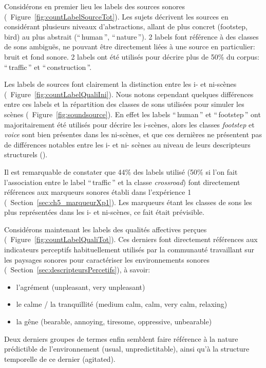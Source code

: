 Considérons en premier lieu les labels des sources sonores (\cf~Figure~\ref{fig:countLabelSourceTot}). Les sujets décrivent les sources en considérant plusieurs niveaux d'abstractions, allant de plus concret (footstep, bird) au plus abstrait (``\,human\,'', ``\,nature\,''). 2 labels font référence à des classes de sons ambiguës, ne pouvant être directement liées à une source en particulier: bruit et fond sonore. 2 labels ont été utilisés pour décrire plus de 50\% du corpus: ``\,traffic\,'' et ``\,construction\,''. 

Les labels de sources font clairement la distinction entre les i- et ni-scènes (\cf~Figure~\ref{fig:countLabelQualiIni}). Nous notons cependant quelques différences entre ces labels et la répartition des classes de sons utilisées pour simuler les scènes (\cf~Figure~\ref{fig:soundsource}).  En effet les labels ``\,human\,'' et ``\,footstep\,'' ont majoritairement été utilisés pour décrire les i-scènes, alors les classes \emph{footstep} et \emph{voice} sont bien présentes dans les ni-scènes, et que ces dernières ne présentent pas de différences notables entre les i- et ni- scènes au niveau de leurs descripteurs structurels (). 
 
Il est remarquable de constater que 44\% des labels utilisé (50\% si l'on fait l'association entre le label ``\,traffic\,'' et la classe \emph{crossroad}) font directement références aux marqueurs sonores établi dans l'expérience 1 (\cf~Section~\ref{sec:ch5_marqueurXp1}). Les marqueurs étant les classes de sons les plus représentées dans les i- et ni-scènes, ce fait était prévisible.

Considérons maintenant les labels des qualités affectives perçues (\cf~Figure~\ref{fig:countLabelQualiTot}). Ces derniers font directement  références aux indicateurs perceptifs habituellement utilisés par la communauté travaillant sur les paysages sonores pour caractériser les environnements sonores (\cf~Section~\ref{sec:descripteursPercetifs}), à savoir:

\begin{itemize}
\item l'agrément (unpleasant, very unpleasant)
\item le calme / la tranquillité (medium calm, calm, very calm, relaxing)
\item la gêne (bearable, annoying, tiresome, oppressive, unbearable)
\end{itemize}

Deux derniers groupes de termes enfin semblent faire référence à la nature prédictible de l'environnement (usual, unpredictitable), ainsi qu'à la structure temporelle de ce dernier (agitated). 

